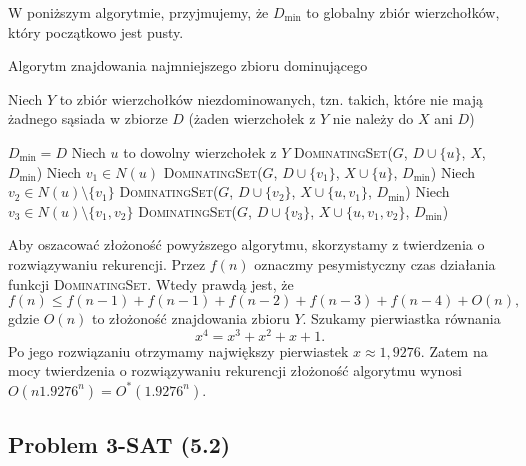 W poniższym algorytmie, przyjmujemy, że $D_{\min}$ to globalny zbiór
wierzchołków, który początkowo jest pusty.
\begin{algorithm}[H]
	\caption{Algorytm znajdowania najmniejszego zbioru dominującego}
	\begin{algorithmic}[1]
		\State \Return
		\EndIf
		\State Niech $Y$ to zbiór wierzchołków niezdominowanych, tzn. takich, które nie mają żadnego sąsiada w zbiorze $D$ (żaden
		wierzchołek z $Y$ nie należy do $X$ ani $D$)		

		\State $D_{\min} = D$
		\EndIf
		\State \Return
		\EndIf
		\State Niech $u$ to dowolny wierzchołek z $Y$
		\State \textsc{DominatingSet}($G$, $D \cup \{u\}$, $X$, $D_{\min}$)
		\State Niech $v_1 \in N(u)$
		\State \textsc{DominatingSet}($G$, $D \cup \{v_1\}$, $X \cup \{u\}$, $D_{\min}$)
		\EndIf
		\EndIf
		\State Niech $v_2 \in N(u) \setminus \{v_1\}$
		\State \textsc{DominatingSet}($G$, $D \cup \{v_2\}$, $X \cup \{u, v_1\}$, $D_{\min}$)
		\EndIf
		\EndIf
		\State Niech $v_3 \in N(u) \setminus \{v_1, v_2\}$
		\State \textsc{DominatingSet}($G$, $D \cup \{v_3\}$, $X \cup \{u, v_1, v_2\}$, $D_{\min}$)
		\EndIf
		\EndIf
		\EndProcedure		
	\end{algorithmic}
\end{algorithm}

Aby oszacować złożoność powyższego algorytmu, skorzystamy z 
twierdzenia o rozwiązywaniu rekurencji. Przez $f(n)$
oznaczmy pesymistyczny czas działania funkcji \textsc{DominatingSet}.
Wtedy prawdą jest, że
\[f(n) \leq f(n-1) + f(n-1) + f(n-2) + f(n-3) + f(n-4) + O(n),\]
gdzie $O(n)$ to złożoność znajdowania zbioru $Y$. 
Szukamy pierwiastka równania
\[x^4 = x^3 + x^2 + x + 1.\]
Po jego rozwiązaniu otrzymamy największy
pierwiastek $x \approx 1{,}9276$. Zatem na mocy twierdzenia
o rozwiązywaniu rekurencji złożoność algorytmu wynosi $O(n1.9276^n) = O^*(1.9276^n)$.

\subsection{Problem 3-SAT (5.2)}

